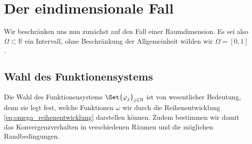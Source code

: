 

\section{Der eindimensionale Fall} %
\label{sec:der_eindimensionale_fall}

Wir beschränken uns nun zunächst auf den Fall einer Raumdimension.
Es sei also $\Omega \subset \mathbb{R}$ ein Intervall, ohne Beschränkung der Allgemeinheit wählen wir $\Omega = [0, 1]$.

\subsection{Wahl des Funktionensystems} %
\label{ssub:wahl_der_funktionen_}

Die Wahl des Funktionensystems $\Set{ \varphi_{j} }_{j \in \mathbb{N}}$ ist von wesentlicher Bedeutung, denn sie legt fest, welche Funktionen $\omega$ wir durch die Reihenentwicklung \eqref{eq:omega_reihenentwicklung} darstellen können.
Zudem bestimmen wir damit das Konvergenzverhalten in verschiedenen Räumen und die möglichen Randbedingungen.

